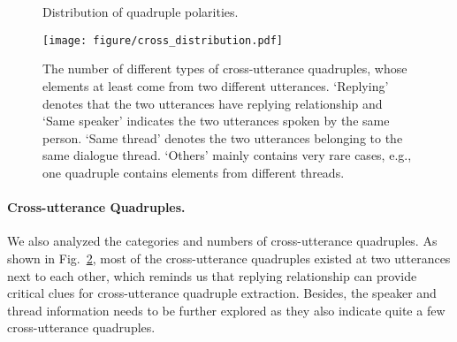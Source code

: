\documentclass[11pt]{article}
\begin{document}
\begin{figure}[!h]
\centering

 \\  
	
 \\ 

\caption{Distribution of quadruple polarities.}
\label{fig:polarity_distribution}
\end{figure}

\begin{figure}[!t]
  \centering
  \texttt{[image: figure/cross\_distribution.pdf]}
  \caption{
  The number of different types of cross-utterance quadruples, whose elements at least come from two different utterances. 
  `Replying' denotes that the two utterances have replying relationship and `Same speaker' indicates the two utterances spoken by the same person.
  `Same thread' denotes the two utterances belonging to the same dialogue thread.
  `Others' mainly contains very rare cases, e.g., one quadruple contains elements from different threads.
  }
  \label{fig:cross-utterance}
\end{figure}

\paragraph{Cross-utterance Quadruples.}
We also analyzed the categories and numbers of cross-utterance quadruples.
As shown in Fig.~\ref{fig:cross-utterance}, most of the cross-utterance quadruples existed at two utterances next to each other, which reminds us that replying relationship can provide critical clues for cross-utterance quadruple extraction. 
Besides, the speaker and thread information needs to be further explored as they also indicate quite a few cross-utterance quadruples.
\end{document}
